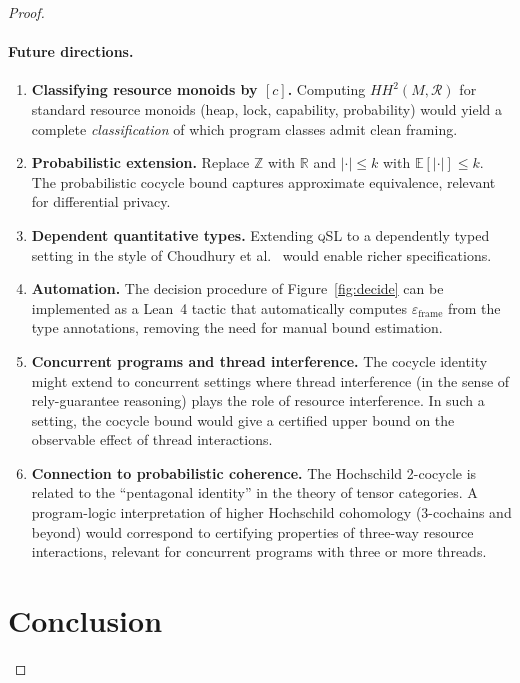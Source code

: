 \documentclass[acmsmall,sigplan,anonymous,review,screen]{acmart}
\theoremstyle{plain}
\theoremstyle{definition}
\newcommand{\qSL}{\textsc{qSL}\xspace}
\newcommand{\HH}[2]{H\!H^{#1}(#2)}
\newcommand{\defect}{\varepsilon}
\begin{document}
\begin{proof}
\paragraph{Future directions.}
\begin{enumerate}[label=(\arabic*),itemsep=2pt]
  \item \textbf{Classifying resource monoids by $[c]$.}
    Computing $\HH{2}{M, \mathcal{R}}$ for standard resource monoids
    (heap, lock, capability, probability) would yield a complete
    \emph{classification} of which program classes admit clean framing.
  \item \textbf{Probabilistic extension.}
    Replace $\mathbb{Z}$ with $\mathbb{R}$ and $|\cdot| \leq k$ with
    $\mathbb{E}[|\cdot|] \leq k$.  The probabilistic cocycle bound
    captures approximate equivalence, relevant for differential privacy.
  \item \textbf{Dependent quantitative types.}
    Extending \qSL to a dependently typed setting in the style of
    Choudhury et al.~\cite{choudhury2021graded} would enable richer
    specifications.
  \item \textbf{Automation.}
    The decision procedure of Figure~\ref{fig:decide} can be implemented
    as a Lean~4 tactic that automatically computes $\defect_{\mathrm{frame}}$
    from the type annotations, removing the need for manual bound estimation.
  \item \textbf{Concurrent programs and thread interference.}
    The cocycle identity might extend to concurrent settings where
    thread interference (in the sense of rely-guarantee reasoning) plays
    the role of resource interference.  In such a setting, the cocycle
    bound would give a certified upper bound on the observable effect
    of thread interactions.
  \item \textbf{Connection to probabilistic coherence.}
    The Hochschild 2-cocycle is related to the ``pentagonal identity''
    in the theory of tensor categories.  A program-logic interpretation
    of higher Hochschild cohomology (3-cochains and beyond) would correspond
    to certifying properties of three-way resource interactions, relevant
    for concurrent programs with three or more threads.
\end{enumerate}

\section{Conclusion}
\label{sec:conclusion}


\end{proof}
\end{document}
